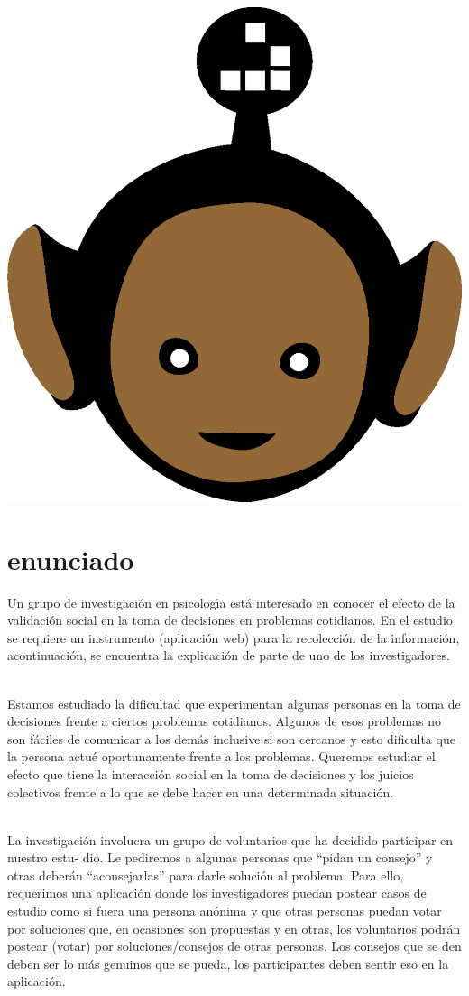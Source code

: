 \documentclass[10pt,a4paper]{article} %
\begin{document}
    \title{\rmfamily\normalfont{}}
    \author{}
    \date{\today}

    \maketitle


    \includegraphics[width=0.1\linewidth]{negro_cara.png}
    \section{enunciado}

        Un grupo de investigación en psicologı́a está interesado en conocer el efecto de la
        validación social en la toma de decisiones en problemas cotidianos. En el estudio
        se requiere un instrumento (aplicación web) para la recolección de la información,
        acontinuación, se encuentra la explicación de parte de uno de los investigadores.

        \\ Estamos estudiado la dificultad que experimentan algunas personas en la toma de decisiones frente
        a ciertos problemas cotidianos. Algunos de esos problemas no son fáciles de comunicar a los demás
        inclusive si son cercanos y esto dificulta que la persona actué oportunamente frente a los problemas.
        Queremos estudiar el efecto que tiene la interacción social en la toma de decisiones y los juicios
        colectivos frente a lo que se debe hacer en una determinada situación.

        \\ La investigación involucra un grupo de voluntarios que ha decidido participar en nuestro estu-
        dio. Le pediremos a algunas personas que “pidan un consejo” y otras deberán “aconsejarlas” para
        darle solución al problema. Para ello, requerimos una aplicación donde los investigadores puedan
        postear casos de estudio como si fuera una persona anónima y que otras personas puedan votar por
        soluciones que, en ocasiones son propuestas y en otras, los voluntarios podrán postear (votar) por
        soluciones/consejos de otras personas. Los consejos que se den deben ser lo más genuinos que se
        pueda, los participantes deben sentir eso en la aplicación.
\end{document}

